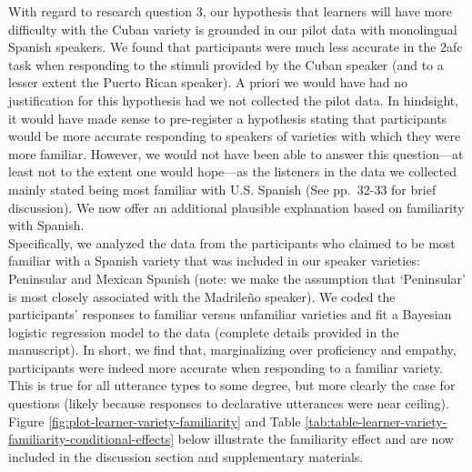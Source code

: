 \documentclass[]{article}
\begin{document}
With regard to research question 3, our hypothesis that learners will have more difficulty with the Cuban variety is grounded in our pilot data with monolingual Spanish speakers.
We found that participants were much less accurate in the 2afc task when responding to the stimuli provided by the Cuban speaker (and to a lesser extent the Puerto Rican speaker).
A priori we would have had no justification for this hypothesis had we not collected the pilot data.
In hindsight, it would have made sense to pre-register a hypothesis stating that participants would be more accurate responding to speakers of varieties with which they were more familiar.
However, we would not have been able to answer this question---at least not to the extent one would hope---as the listeners in the data we collected mainly stated being most familiar with U.S. Spanish (See pp.~32-33 for brief discussion).
We now offer an additional plausible explanation based on familiarity with Spanish.\\
Specifically, we analyzed the data from the participants who claimed to be most familiar with a Spanish variety that was included in our speaker varieties: Peninsular and Mexican Spanish (note: we make the assumption that `Peninsular' is most closely associated with the Madrileño speaker).
We coded the participants' responses to familiar versus unfamiliar varieties and fit a Bayesian logistic regression model to the data (complete details provided in the manuscript).
In short, we find that, marginalizing over proficiency and empathy, participants were indeed more accurate when responding to a familiar variety.
This is true for all utterance types to some degree, but more clearly the case for questions (likely because responses to declarative utterances were near ceiling).
Figure \ref{fig:plot-learner-variety-familiarity} and Table \ref{tab:table-learner-variety-familiarity-conditional-effects} below illustrate the familiarity effect and are now included in the discussion section and supplementary materials.

\clearpage
\end{document}
